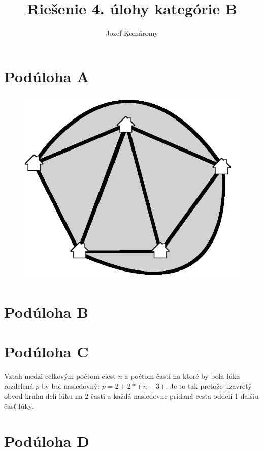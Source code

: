 \documentclass{article}
\begin{document}
\title{Riešenie 4. úlohy kategórie B}
\author{Jozef Komáromy}

\maketitle

\section{Podúloha A}

\begin{figure}[h]
  \centering
\includegraphics{A}
\end{figure}

\section{Podúloha B}



\section{Podúloha C}

Vzťah medzi celkovým počtom ciest \(n\) a počtom častí na ktoré by bola lúka rozdelená \(p\) by bol nasledovný: \(p = 2 + 2 * (n - 3)\). Je to tak pretože uzavretý obvod kruhu delí lúku na 2 časti a každá nasledovne pridaná cesta oddelí 1 ďalšiu časť lúky.

\section{Podúloha D}
\end{document}
